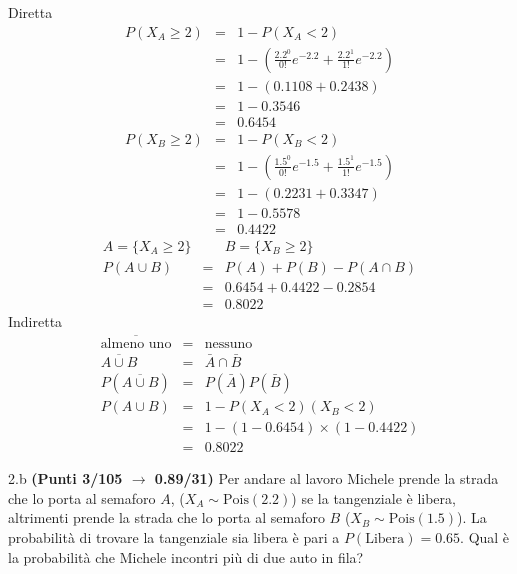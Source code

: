 \documentclass[
  11pt,
]{book}
\theoremstyle{mytheoremstyle}
\theoremstyle{mydefstyle}
\newenvironment{sol}
  {
  \begin{tcolorbox}[enhanced,breakable,arc=0.1mm,boxrule=1pt,colback=white,colframe=iblue,
  title=\bf \fontfamily{lmss}\selectfont \hspace{.5 cm} Soluzione,drop fuzzy shadow]

}{
\end{tcolorbox}
  }
\begin{document}
\begin{sol}
Diretta
\begin{eqnarray*}
   P( X_A \geq 2 ) &=& 1-P( X_A < 2 ) \\                 &=& 1-\left( \frac{ 2.2 ^{ 0 }}{ 0 !}e^{- 2.2 }+\frac{ 2.2 ^{ 1 }}{ 1 !}e^{- 2.2 } \right)\\                 &=& 1-( 0.1108+0.2438 )\\                 &=& 1- 0.3546 \\                 &=&   0.6454 
\end{eqnarray*}
\begin{eqnarray*}
   P( X_B \geq 2 ) &=& 1-P( X_B < 2 ) \\                 &=& 1-\left( \frac{ 1.5 ^{ 0 }}{ 0 !}e^{- 1.5 }+\frac{ 1.5 ^{ 1 }}{ 1 !}e^{- 1.5 } \right)\\                 &=& 1-( 0.2231+0.3347 )\\                 &=& 1- 0.5578 \\                 &=&   0.4422 
\end{eqnarray*}
\begin{eqnarray*}
  A =\{X_A\ge 2\} && B =\{X_B\ge 2\}\\
  P(A\cup B) &=&  P(A)+P(B)-P(A\cap B)\\
  &=& 0.6454+0.4422-0.2854\\
  &=& 0.8022
\end{eqnarray*}
Indiretta
\begin{eqnarray*}
  \overline{\text{almeno uno}} &=&  \text{nessuno}\\
  \overline{A\cup B} &=& \bar A\cap \bar B\\
  P(\overline{A\cup B}) &=& P(\bar A)P(\bar B)\\
  P(A\cup B) &=& 1- P(X_A<2)(X_B<2)\\
  &=& 1-(1-0.6454 )\times(1-0.4422)\\
  &=& 0.8022
\end{eqnarray*}

\end{sol}

2.b \textbf{(Punti 3/105 \(\rightarrow\) 0.89/31)} Per andare al lavoro Michele prende la strada che
lo porta al semaforo \(A\), (\(X_A\sim \text{Pois}(2.2)\)) se la tangenziale è libera, altrimenti
prende la strada che lo porta al semaforo \(B\) (\(X_B\sim \text{Pois}(1.5)\)).
La probabilità di trovare la tangenziale sia libera è pari a
\(P(\text{Libera})=0.65\). Qual è la probabilità che Michele incontri più di due auto in fila?
\end{document}
